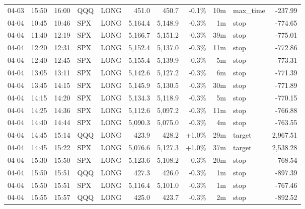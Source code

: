 \documentclass[11pt,a4paper,twoside]{article}
\begin{document}
\begin{center}
\begin{longtable}{>{\color{txtmain}}l l l l l r r r r >{\color{txtmain}}l r}
04-03 & 15:50 & 16:00 & QQQ & LONG & 451.0 & 450.7 & \textcolor{lossred}{-0.1\%} & 10m & max\_time & \textcolor{lossred}{-237.99} \\
04-04 & 10:45 & 10:46 & SPX & LONG & 5,164.4 & 5,148.9 & \textcolor{lossred}{-0.3\%} & 1m & stop & \textcolor{lossred}{-774.65} \\
04-04 & 11:40 & 12:19 & SPX & LONG & 5,166.7 & 5,151.2 & \textcolor{lossred}{-0.3\%} & 39m & stop & \textcolor{lossred}{-775.01} \\
04-04 & 12:20 & 12:31 & SPX & LONG & 5,152.4 & 5,137.0 & \textcolor{lossred}{-0.3\%} & 11m & stop & \textcolor{lossred}{-772.86} \\
04-04 & 12:40 & 12:45 & SPX & LONG & 5,155.4 & 5,139.9 & \textcolor{lossred}{-0.3\%} & 5m & stop & \textcolor{lossred}{-773.31} \\
04-04 & 13:05 & 13:11 & SPX & LONG & 5,142.6 & 5,127.2 & \textcolor{lossred}{-0.3\%} & 6m & stop & \textcolor{lossred}{-771.39} \\
04-04 & 13:45 & 14:15 & SPX & LONG & 5,145.9 & 5,130.5 & \textcolor{lossred}{-0.3\%} & 30m & stop & \textcolor{lossred}{-771.89} \\
04-04 & 14:15 & 14:20 & SPX & LONG & 5,134.3 & 5,118.9 & \textcolor{lossred}{-0.3\%} & 5m & stop & \textcolor{lossred}{-770.15} \\
04-04 & 14:25 & 14:36 & SPX & LONG & 5,112.6 & 5,097.2 & \textcolor{lossred}{-0.3\%} & 11m & stop & \textcolor{lossred}{-766.88} \\
04-04 & 14:40 & 14:44 & SPX & LONG & 5,090.3 & 5,075.0 & \textcolor{lossred}{-0.3\%} & 4m & stop & \textcolor{lossred}{-763.55} \\
04-04 & 14:45 & 15:14 & QQQ & LONG & 423.9 & 428.2 & \textcolor{wingreen}{+1.0\%} & 29m & target & \textcolor{wingreen}{2,967.51} \\
04-04 & 14:45 & 15:22 & SPX & LONG & 5,076.6 & 5,127.3 & \textcolor{wingreen}{+1.0\%} & 37m & target & \textcolor{wingreen}{2,538.28} \\
04-04 & 15:30 & 15:50 & SPX & LONG & 5,123.6 & 5,108.2 & \textcolor{lossred}{-0.3\%} & 20m & stop & \textcolor{lossred}{-768.54} \\
04-04 & 15:50 & 15:51 & QQQ & LONG & 427.3 & 426.0 & \textcolor{lossred}{-0.3\%} & 1m & stop & \textcolor{lossred}{-897.39} \\
04-04 & 15:50 & 15:51 & SPX & LONG & 5,116.4 & 5,101.0 & \textcolor{lossred}{-0.3\%} & 1m & stop & \textcolor{lossred}{-767.46} \\
04-04 & 15:55 & 15:57 & QQQ & LONG & 425.0 & 423.7 & \textcolor{lossred}{-0.3\%} & 2m & stop & \textcolor{lossred}{-892.52} \\

\end{longtable}
\end{center}
\end{document}
